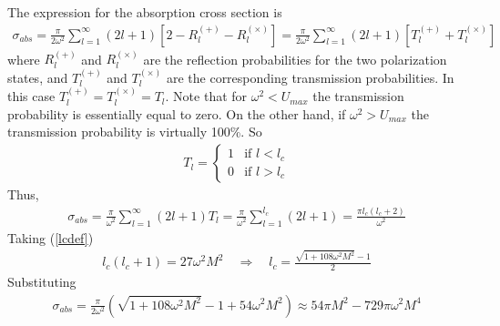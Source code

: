 \documentclass[12pt]{article}
\begin{document}
The expression for the absorption cross section is 
\begin{gather}
\sigma_{abs}
=
\frac{\pi}{2 \omega^{2}}
\sum_{l=1}^{\infty}
(2 l + 1)
\left[
2 - R_{l}^{(+)} - R_{l}^{(\times)}
\right]
=
\frac{\pi}{2 \omega^{2}}
\sum_{l=1}^{\infty}
(2 l + 1)
\left[
T_{l}^{(+)} + T_{l}^{(\times)}
\right]
\end{gather}
where $R_{l}^{(+)}$ and $R_{l}^{(\times)}$ are the reflection probabilities for the two polarization states, and $T_{l}^{(+)}$ and $T_{l}^{(\times)}$ are the corresponding transmission probabilities. In this case $T_{l}^{(+)} = T_{l}^{(\times)} = T_{l}$. Note that for $\omega^{2} < U_{max}$ the transmission probability is essentially equal to zero. On the other hand, if $\omega^{2} > U_{max}$ the transmission probability is virtually 100\%. So
\begin{gather}
T_{l} 
=
\left\{
\begin{array}{cc}
1 & \textrm{if } l < l_{c}
\\
0 & \textrm{if } l > l_{c}
\end{array}
\right.
\end{gather}
Thus,
\begin{gather}
\sigma_{abs}
=
\frac{\pi}{\omega^{2}}
\sum_{l=1}^{\infty}
(2 l + 1)
T_{l}
=
\frac{\pi}{\omega^{2}}
\sum_{l=1}^{l_{c}}
(2 l + 1)
=
\frac{\pi l_{c} (l_{c} + 2)}{\omega^{2}}
\end{gather}
Taking (\ref{lcdef}) 
\begin{gather}
l_{c} (l_{c} + 1)
=
27 \omega^{2} M^{2}
\quad
\Rightarrow
\quad
l_{c} = \frac{\sqrt{1 + 108 \omega^{2} M^{2}} - 1}{2}
\end{gather}
Substituting
\begin{gather}
\sigma_{abs}
=
\frac{\pi}{2 \omega^{2}}
(\sqrt{1 + 108 \omega^{2} M^{2}} -1 + 54 \omega^{2} M^{2})
\approx
54 \pi M^{2}
-
729
\pi \omega^{2} M^{4}
\end{gather}
\end{document}
